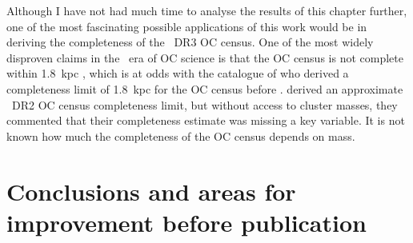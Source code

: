 Although I have not had much time to analyse the results of this chapter further, one of the most fascinating possible applications of this work would be in deriving the completeness of the \gaia\ DR3 OC census. One of the most widely disproven claims in the \gaia\ era of OC science is that the OC census is not complete within 1.8~kpc \citep{cantat-gaudin_milky_2022}, which is at odds with the catalogue of \cite{kharchenko_global_2013} who derived a completeness limit of 1.8~kpc for the OC census before \gaia. \cite{anders_milky_2020} derived an approximate \gaia\ DR2 OC census completeness limit, but without access to cluster masses, they commented that their completeness estimate was missing a key variable. It is not known how much the completeness of the OC census depends on mass.



\section{Conclusions and areas for improvement before publication}
\label{sec:dynamics:conclusion}
